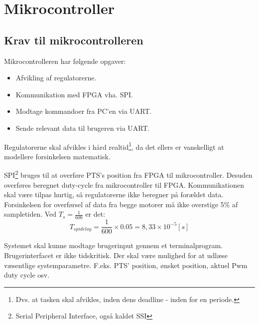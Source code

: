 \section{Mikrocontroller}


\label{sec:mikrocontroller}
\subsection{Krav til mikrocontrolleren}
Mikrocontrolleren har følgende opgaver: 


\begin{itemize}
\itemsep1pt
	\item Afvikling af regulatorerne.
	\item Kommunikation med FPGA vha. SPI.
	\item Modtage kommandoer fra PC'en via UART.
	\item Sende relevant data til brugeren via UART.
\end{itemize}

Regulatorerne skal afvikles i hård realtid\footnote{Dvs. at tasken skal afvikles, inden dens deadline - inden for en periode.}, da det ellers er vanskelligt at modellere forsinkelsen matematisk.


SPI\footnote{Serial Peripheral Interface, også kaldet SSI} bruges til at overføre PTS's position fra FPGA til mikrocontroller. Desuden overføres beregnet duty-cycle fra mikrocontroller til FPGA. Kommunikationen skal være tilpas hurtig, så regulatorerne ikke beregner på forældet data. Forsinkelsen for overførsel af data fra begge motorer må ikke overstige 5\% af sampletiden. Ved $T_s = \frac{1}{600}$ er det: 
\begin{equation}
	T_{spi delay} = \frac{1}{600} \times 0.05 = 8,33 \times 10^{-5}[s]
\end{equation}


Systemet skal kunne modtage brugerinput gennem et terminalprogram. Brugerinterfacet er ikke tidskritisk. Der skal være mulighed for at udlæse væsentlige systemparametre. F.eks. PTS' position, ønsket position, aktuel Pwm duty cycle osv.

